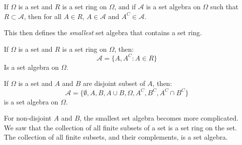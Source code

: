                 \begin{theorem}
                    If $\Omega$ is a set and $R$ is a set ring
                    on $\Omega$, and if $\mathcal{A}$ is a set
                    algebra on $\Omega$ such that
                    $R\subset\mathcal{A}$, then for all $A\in{R}$,
                    $A\in\mathcal{A}$ and $A^{C}\in\mathcal{A}$.
                \end{theorem}
                This then defines the \textit{smallest} set algebra
                that contains a set ring.
                \begin{theorem}
                    If $\Omega$ is a set and $R$ is a set ring on
                    $\Omega$, then:
                    \begin{equation}
                        \mathcal{A}=\{A,A^{C}:A\in{R}\}
                    \end{equation}
                    Is a set algebra on $\Omega$.
                \end{theorem}
                \begin{theorem}
                    If $\Omega$ is a set and $A$ and $B$ are
                    disjoint subset of $A$, then:
                    \begin{equation}
                        \mathcal{A}=
                            \{\emptyset,A,B,A\cup{B},
                              \Omega,A^{C},B^{C},A^{C}\cap{B}^{C}\}
                    \end{equation}
                    is a set algebra on $\Omega$.
                \end{theorem}
                For non-disjoint $A$ and $B$, the smallest
                set algebra becomes more complicated. We saw that
                the collection of all finite subsets of a set is
                a set ring on the set. The collection of all finite
                subsets, and their complements, is a set algebra.
